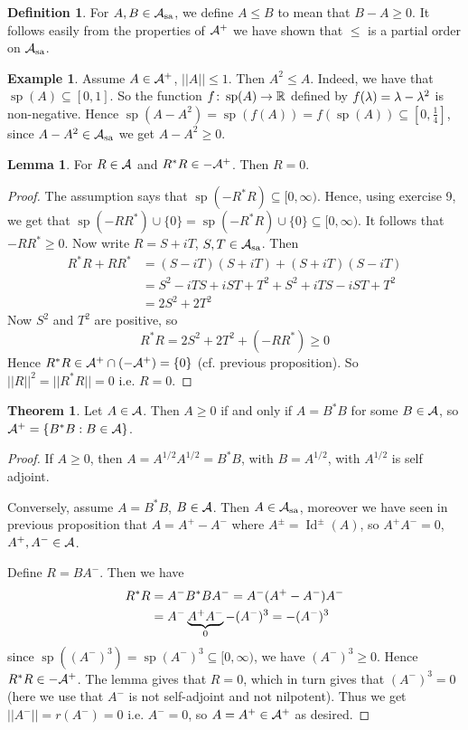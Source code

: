 \documentclass[10pt,english,a4paper]{article}
\theoremstyle{definition}
\newtheorem*{definition}{Definition}
\newtheorem*{theorem}{Theorem}
\newtheorem*{lemma}{Lemma}
\newtheorem*{example}{Example}
\def\Assa{\As_{\text{sa}}}
\DeclareMathOperator{\Id}{Id}
\DeclareMathOperator{\Sp}{sp}
\begin{document}
\begin{definition}
    For $A,B \in \Assa$, we define $A \leq B$ to mean that $B-A \geq 0$. It follows 
    easily from the properties of $\mathcal{A}^+$ we have shown that $\leq$ is a
    partial order on $\Assa$.
\end{definition}
\begin{example}
    Assume $A \in \mathcal{A}^+$, $||A|| \leq 1$. Then $A^2 \leq A$. Indeed, we have that 
    $\Sp(A) \subseteq [0,1]$. So the function $f\colon \Sp(A)\to \R$ 
defined by $f(\lambda) = \lambda - \lambda^2$ is non-negative. Hence 
$\Sp(A-A^2) = \Sp(f(A)) = f(\Sp(A)) \subseteq [0,\tfrac{1}{4}]$, since $A-A^2 \in \Assa$
we get $A-A^2 \geq 0$.
\end{example}

\begin{lemma}
    For $R \in \mathcal{A}$ and $R^*R \in -\mathcal{A}^+$. Then $R =0$.
\end{lemma}
\begin{proof}
    The assumption says that $\Sp(-R^*R) \subseteq [ 0, \infty)$. Hence, using 
    exercise 9, we get that $\Sp(-RR^*)\cup\{0\} = \Sp(-R^*R)\cup \{0\}
    \subseteq [0,\infty)$. It follows that $-RR^* \geq 0$.
    Now write $R = S + iT$, $S,T \in \Assa$. Then 
    \begin{align*}
    R^*R+RR^* &= (S-iT)(S+iT) + (S+iT)(S-iT) \\
    &= S^2 -iTS + iST + T^2 + S^2 + iTS -iST + T^2\\
    &= 2S^2 + 2T^2
    \end{align*}    
    Now $S^2$ and $T^2$ are positive, so 
    \[R^* R = 2S^2 + 2T^2 + (-RR^*) \geq 0\]
    Hence $R^*R \in \mathcal{A}^+ \cap (-\mathcal{A}^+) = \{0\}$ (cf. previous proposition).
    So $||R||^2 = ||R^*R|| = 0$ i.e. $R=0$.

\end{proof}

\begin{theorem}
    Let $A \in \mathcal{A}$. Then $A \geq 0$ if and only if $A = B^*B$
for some $B \in \mathcal{A}$, so $\mathcal{A}^+ = \{ B^*B : B \in \mathcal{A} \}$.
\end{theorem}
\begin{proof}
    If $A\geq 0$, then $A = A^{1/2}A^{1/2} = B^*B$, with $B = A^{1/2}$, with 
$A^{1/2}$ is self adjoint. 

Conversely, assume $A = B^*B$, $B \in \mathcal{A}$. Then $A \in \Assa$, moreover we have 
seen in previous proposition that $A = A^+ -A^-$ where $A^{\pm}  = \Id^{\pm}(A)$,
so $A^+A^- = 0$, $A^+,A^- \in \mathcal{A}$.

Define $R = BA^-$. Then we have
\begin{align*}
    R^*R &= A^-B^*BA^- = A^-(A^+-A^-)A^- \\
         &= A^- \underbrace{A^+A^-}_0 - (A^-)^3 = - (A^-)^3
\end{align*}
since $\Sp((A^-)^3) = \Sp(A^-)^3 \subseteq [0,\infty)$, we have
$(A^-)^3 \geq 0$. Hence $R^*R \in -\mathcal{A}^+$.
The lemma gives that $R=0$, which in turn gives that $(A^-)^3 = 0$ 
(here we use that $A^-$ is not self-adjoint and not nilpotent).  
Thus we get $||A^-|| = r(A^-) = 0$ i.e. $A^{-} = 0$, so $A = A^{+} \in \mathcal{A}^+$
as desired. 
\end{proof}
\end{document}
